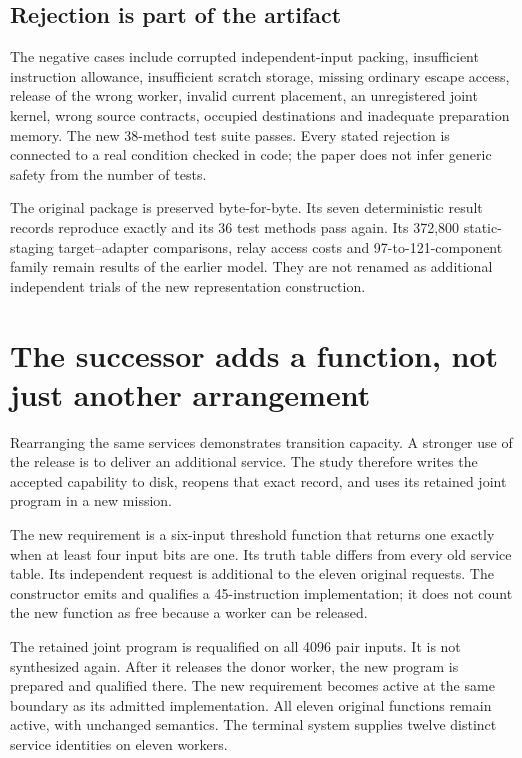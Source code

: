\documentclass[11pt,letterpaper]{article}
\theoremstyle{definition}\newtheorem{definition}[theorem]{Definition}
\theoremstyle{remark}\newtheorem{remark}[theorem]{Remark}
\begin{document}
\subsection{Rejection is part of the artifact}
The negative cases include corrupted independent-input packing, insufficient instruction allowance, insufficient scratch storage, missing ordinary escape access, release of the wrong worker, invalid current placement, an unregistered joint kernel, wrong source contracts, occupied destinations and inadequate preparation memory. The new 38-method test suite passes. Every stated rejection is connected to a real condition checked in code; the paper does not infer generic safety from the number of tests.

The original package is preserved byte-for-byte. Its seven deterministic result records reproduce exactly and its 36 test methods pass again. Its 372,800 static-staging target--adapter comparisons, relay access costs and 97-to-121-component family remain results of the earlier model. They are not renamed as additional independent trials of the new representation construction.

\section{The successor adds a function, not just another arrangement}
\label{sec:successor}
Rearranging the same services demonstrates transition capacity. A stronger use of the release is to deliver an additional service. The study therefore writes the accepted capability to disk, reopens that exact record, and uses its retained joint program in a new mission.

The new requirement is a six-input threshold function that returns one exactly when at least four input bits are one. Its truth table differs from every old service table. Its independent request is additional to the eleven original requests. The constructor emits and qualifies a 45-instruction implementation; it does not count the new function as free because a worker can be released.

The retained joint program is requalified on all 4096 pair inputs. It is not synthesized again. After it releases the donor worker, the new program is prepared and qualified there. The new requirement becomes active at the same boundary as its admitted implementation. All eleven original functions remain active, with unchanged semantics. The terminal system supplies twelve distinct service identities on eleven workers.
\end{document}
